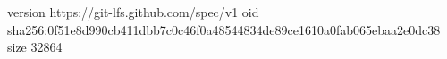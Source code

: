 version https://git-lfs.github.com/spec/v1
oid sha256:0f51e8d990cb411dbb7c0c46f0a48544834de89ce1610a0fab065ebaa2e0dc38
size 32864
